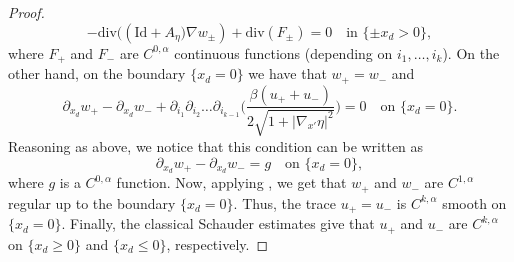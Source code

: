 \documentclass[JEP,XML,SOM,Unicode]{cedram}
\newcommand{\Id}{\mathrm{Id}}
\theoremstyle{plain}
\theoremstyle{definition}
\let\ds\displaystyle
\begin{document}
\begin{proof}
\[\ds-\text{div}\big((\Id+A_\eta\big)\nabla w_\pm)+\text{div}(F_\pm)=0\quad\text{in } \{\pm x_d>0\},\]
where $F_+$ and $F_-$ are $C^{0,\alpha}$ continuous functions (depending on $i_1,\dots,i_k$). On the other hand, on the boundary $\{x_d=0\}$ we have that $w_+=w_-$ and
\[\ds\partial_{x_d}w_+-\partial_{x_d}w_-+\partial_{i_1}\partial_{i_2}\dots\partial_{i_{k-1}}\biggl(\frac{\beta (u_++u_-)}{2\sqrt{1+|\nabla_{x'}\eta|^2}}\biggr)=0\quad\text{on }\{x_d=0\}.\]
Reasoning as above, we notice that this condition can be written as
\[\ds\partial_{x_d}w_+-\partial_{x_d}w_-=g\quad\text{on }\{x_d=0\},\]
where $g$ is a $C^{0,\alpha}$ function.
Now, applying \cite[Th.\,1.2]{D}, we get that $w_+$ and $w_-$ are $C^{1,\alpha}$ regular up to the boundary $\{x_d=0\}$.
Thus, the trace $u_+=u_-$ is $C^{k,\alpha}$ smooth on $\{x_d=0\}$. Finally, the classical Schauder estimates give that $u_+$ and $u_-$ are $C^{k,\alpha}$ on $\{x_d\ge 0\}$ and $\{x_d\le 0\}$, respectively.
\end{proof}
\end{document}
